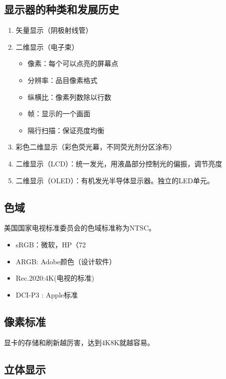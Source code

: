 \documentclass{ctexart}
\theoremstyle{cnthm}
\begin{document}
\subsection{显示器的种类和发展历史}

\begin{enumerate}
    \item 矢量显示（阴极射线管）
    \item 二维显示（电子束）
    \begin{itemize}
        \item 像素：每个可以点亮的屏幕点
        \item 分辨率：品目像素格式
        \item 纵横比：像素列数除以行数
        \item 帧：显示的一个画面
        \item 隔行扫描：保证亮度均衡
    \end{itemize}
    \item 彩色二维显示（彩色荧光幕，不同荧光剂分区涂布）
    \item 二维显示（LCD）：统一发光，用液晶部分控制光的偏振，调节亮度
    \item 二维显示（OLED）：有机发光半导体显示器。独立的LED单元。
\end{enumerate}

\subsection{色域}

美国国家电视标准委员会的色域标准称为NTSC。

\begin{itemize}
    \item sRGB：微软，HP（72%
    \item ARGB: Adobe颜色（设计软件）
    \item Rec.2020:4K(电视的标准)
    \item DCI-P3 : Apple标准
\end{itemize}

\subsection{像素标准}

显卡的存储和刷新越厉害，达到4K8K就越容易。

\subsection{立体显示}
\end{document}
